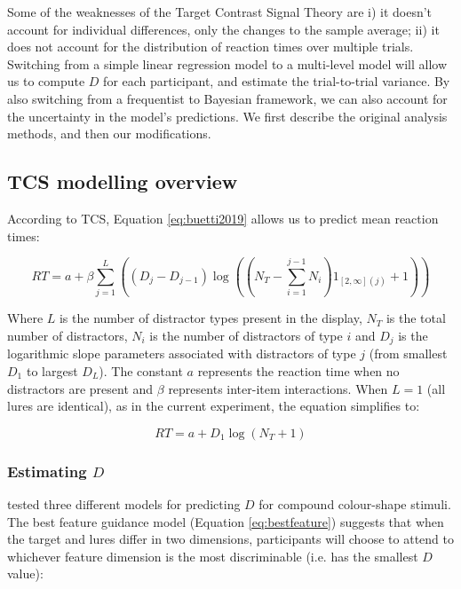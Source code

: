 \documentclass[smallextended]{svjour3}       %
\begin{document}
Some of the weaknesses of the Target Contrast Signal Theory are i) it doesn't account for individual differences, only the changes to the sample average;  ii) it does not account for the distribution of reaction times over multiple trials. Switching from a simple linear regression model to a multi-level model will allow us to compute $D$ for each participant, and estimate the trial-to-trial variance. By also switching from a frequentist to Bayesian framework, we can also account for the uncertainty in the model's predictions. We first describe the original analysis methods, and then our modifications. 

\subsection{TCS modelling overview} 

According to TCS, Equation \ref{eq:buetti2019} allows us to predict mean reaction times:

\begin{equation}
RT = a + \beta\sum_{j=1}^L\left((D_j - D_{j-1})\log\left(\left(N_T - \sum_{i=1}^{j-1}N_i\right)1_{[2,\infty](j)}+1 \right)\right)
\label{eq:buetti2019}
\end{equation}

Where $L$ is the number of distractor types present in the display, $N_T$ is the total number of distractors, $N_i$ is the number of distractors of type $i$ and $D_j$ is the logarithmic slope parameters associated with distractors of type $j$ (from smallest $D_1$ to largest $D_L$). The constant $a$ represents the reaction time when no distractors are present and $\beta$ represents inter-item interactions. When $L=1$ (all lures are identical), as in the current experiment, the equation simplifies to:

\begin{equation}
RT = a + D_1\log(N_T+1)
\end{equation}

\subsubsection{Estimating $D$}

\cite{buetti2019predicting} tested three different models for predicting $D$ for compound colour-shape stimuli. The best feature guidance model (Equation \ref{eq:bestfeature}) suggests that when the target and lures differ in two dimensions, participants will choose to attend to whichever feature dimension is the most discriminable (i.e. has the smallest $D$ value):
\end{document}
